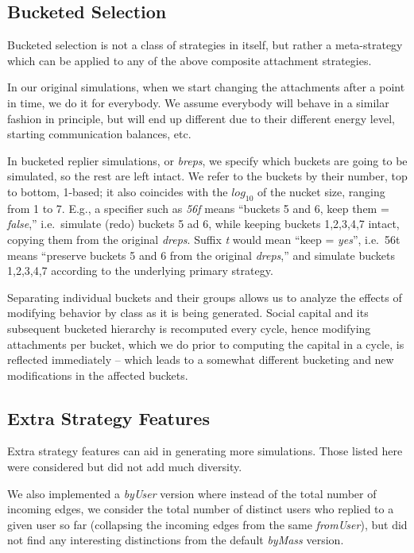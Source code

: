 \documentclass[10pt,oneside]{memoir}
\begin{document}
\subsection{Bucketed Selection}
\label{bucketedselection}

Bucketed selection is not a class of strategies in itself, but rather a meta-strategy which can be applied to any of the above composite attachment strategies.


In our original simulations, when we start changing the attachments after a point in time, we do it for everybody.  We assume everybody will behave in a similar fashion in principle, but will end up different due to their different energy level, starting communication balances, etc.


In bucketed replier simulations, or {\itshape breps}, we specify which buckets are going to be simulated, so the rest are left intact.  We refer to the buckets by their number, top to bottom, 1-based; it also coincides with the $log_{10}$ of the nucket size, ranging from 1 to 7.  E.g., a specifier such as {\itshape 56f} means ``buckets 5 and 6, keep them = {\itshape false},'' i.e.\ simulate (redo) buckets 5 ad 6, while keeping buckets {1,2,3,4,7} intact, copying them from the original {\itshape dreps}.  Suffix {\itshape t} would mean ``keep = {\itshape yes}'', i.e.\ 56t means ``preserve buckets 5 and 6 from the original {\itshape dreps},'' and simulate buckets {1,2,3,4,7} according to the underlying primary strategy.


Separating individual buckets and their groups allows us to analyze the effects of modifying behavior by class as it is being generated.  Social capital and its subsequent bucketed hierarchy is recomputed every cycle, hence modifying attachments per bucket, which we do prior to computing the capital in a cycle, is reflected immediately -- which leads to a somewhat different bucketing and new modifications in the affected buckets.


\subsection{Extra Strategy Features}
\label{extrastrategyfeatures}

\label{sec:extra-strategy-features}
Extra strategy features can aid in generating more simulations.  Those listed here were considered but did not add much diversity.


We also implemented a {\itshape byUser} version where instead of the total number of incoming edges, we consider the total number of distinct users who replied to a given user so far (collapsing the incoming edges from the same \emph{fromUser}), but did not find any interesting distinctions from the default \emph{byMass} version.
\end{document}
